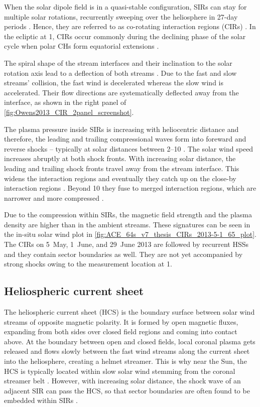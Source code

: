 When the solar dipole field is in a quasi-stable configuration, SIRs can stay for multiple solar rotations, recurrently sweeping over the heliosphere in 27-day periods \citep{Gosling1972}. Hence, they are referred to as co-rotating interaction regions (CIRs) \citep{Smith1976,Balogh1999}.
In the ecliptic at \SI{1}{\au}, CIRs occur commonly during the declining phase of the solar cycle when polar CHs form equatorial extensions \citep{Balogh2009}.

The spiral shape of the stream interfaces and their inclination to the solar rotation axis lead to a deflection of both streams \citep{Balogh2009}. Due to the fast and slow streams' collision, the fast wind is decelerated whereas the slow wind is accelerated. Their flow directions are systematically deflected away from the interface, as shown in the right panel of \autoref{fig:Owens2013_CIR_2panel_screenshot}.

The plasma pressure inside SIRs is increasing with heliocentric distance and therefore, the leading and trailing compressional waves form into foreward and reverse shocks -- typically at solar distances between \SIrange{2}{10}{\au} \citep{Smith1976,Balogh2009}. The solar wind speed increases abruptly at both shock fronts.
With increasing solar distance, the leading and trailing shock fronts travel away from the stream interface. This widens the interaction regions and eventually they catch up on the close-by interaction regions \citep{Burlaga1984}. Beyond \SI{10}{\au} they fuse to merged interaction regions, which are narrower and more compressed \citep{Burlaga1985}.

Due to the compression within SIRs, the magnetic field strength and the plasma density are higher than in the ambient streams. These signatures can be seen in the in-situ solar wind plot in \autoref{fig:ACE_64s_v7_thesis_CIRs_2013-5-1_65_plot}. The CIRs on 5~May, 1~June, and 29~June 2013 are followed by recurrent HSSs and they contain sector boundaries as well. They are not yet accompanied by strong shocks owing to the measurement location at \SI{1}{\au}.


\subsection{Heliospheric current sheet}
The heliospheric current sheet (HCS) is the boundary surface between solar wind streams of opposite magnetic polarity. It is formed by open magnetic fluxes, expanding from both sides over closed field regions and coming into contact above. At the boundary between open and closed fields, local coronal plasma gets released and flows slowly between the fast wind streams along the current sheet into the heliosphere, creating a helmet streamer. This is why near the Sun, the HCS is typically located within slow solar wind stemming from the coronal streamer belt \citep{Owens2013}. However, with increasing solar distance, the shock wave of an adjacent SIR can pass the HCS, so that sector boundaries are often found to be embedded within SIRs \citep{Gosling1999}.

